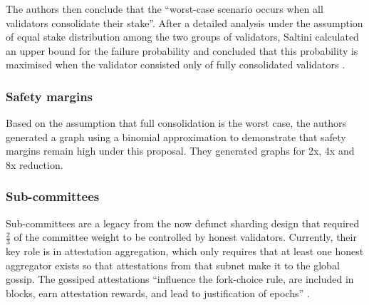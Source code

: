 \documentclass[UTF8]{article}
\begin{document}
The authors then conclude that the ``worst-case scenario occurs when all validators consolidate their stake''. After a detailed analysis under the assumption of equal stake distribution among the two groups of validators, Saltini calculated an upper bound for the failure probability and concluded that this probability is maximised when the validator consisted only of fully consolidated validators \cite{Saltini2023}.


\subsubsection*{Safety margins}
Based on the assumption that full consolidation is the worst case, the authors generated a graph using a binomial approximation to demonstrate that safety margins remain high under this proposal. They generated graphs for 2x, 4x and 8x reduction.

\subsubsection*{Sub-committees}
Sub-committees are a legacy from the now defunct sharding design that required $\frac{2}{3}$ of the committee weight to be controlled by honest validators. Currently, their key role is in attestation aggregation, which only requires that at least one honest aggregator exists so that attestations from that subnet make it to the global gossip. The gossiped attestations ``influence the fork-choice rule, are included in blocks, earn attestation rewards, and lead to justification of epochs''  \cite{damato2023}.
\end{document}
